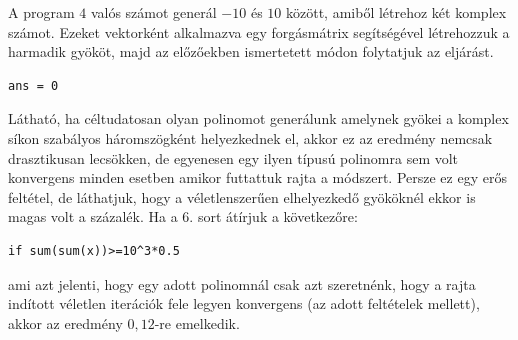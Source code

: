 \documentclass[a4paper,12pt]{report}
\begin{document}
A program $4$ valós számot generál $-10$ és $10$ között, amiből létrehoz két komplex számot. Ezeket vektorként alkalmazva egy forgásmátrix segítségével létrehozzuk a harmadik gyököt, majd az előzőekben ismertetett módon folytatjuk az eljárást.
				\begin{singlespace}
                \begin{lstlisting}[caption=Eredm\'eny]
ans = 0
                \end{lstlisting}
                \end{singlespace}
Látható, ha céltudatosan olyan polinomot generálunk amelynek gyökei a komplex síkon szabályos háromszögként helyezkednek el, akkor ez az eredmény nemcsak drasztikusan lecsökken, de egyenesen egy ilyen típusú polinomra sem volt konvergens minden esetben amikor futtattuk rajta a módszert. Persze ez egy erős feltétel, de láthatjuk, hogy a véletlenszerűen elhelyezkedő gyököknél ekkor is magas volt a százalék. Ha a 6. sort átírjuk a következőre:
\begin{singlespace}
\begin{lstlisting}[firstnumber=6]
if sum(sum(x))>=10^3*0.5
\end{lstlisting}
\end{singlespace}
ami azt jelenti, hogy egy adott polinomnál csak azt szeretnénk, hogy a rajta indított véletlen iterációk fele legyen konvergens (az adott feltételek mellett), akkor az eredmény $0,\!12$-re emelkedik.
\end{document}

